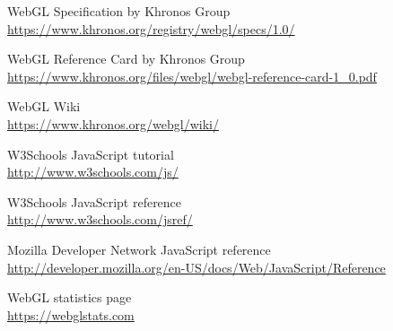 \pagestyle{bibliographyStyle}
\thispagestyle{chapterBeginStyle}
\begin{thebibliography}{9}
	
	WebGL Specification by Khronos Group\\
	\url{https://www.khronos.org/registry/webgl/specs/1.0/}
	
	WebGL Reference Card by Khronos Group\\
	\url{https://www.khronos.org/files/webgl/webgl-reference-card-1_0.pdf}
	
	WebGL Wiki\\
	\url{https://www.khronos.org/webgl/wiki/}
	
	W3Schools JavaScript tutorial\\
	\url{http://www.w3schools.com/js/}
	
	W3Schools JavaScript reference\\
	\url{http://www.w3schools.com/jsref/}
	
	Mozilla Developer Network JavaScript reference\\
	\url{http://developer.mozilla.org/en-US/docs/Web/JavaScript/Reference}
	
	WebGL statistics page\\
	\url{https://webglstats.com}
	
	
\end{thebibliography}
\cleardoublepage